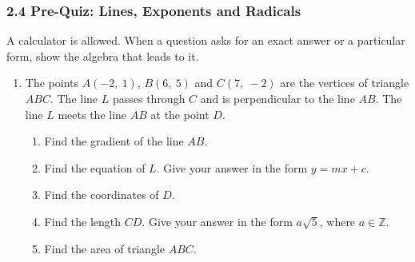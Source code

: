 \documentclass[12pt, twoside]{article}
\begin{document}
\subsubsection*{2.4 Pre-Quiz: Lines, Exponents and Radicals}

A calculator is allowed. When a question asks for an exact answer or a
particular form, show the algebra that leads to it.

\begin{enumerate}[itemsep=0.15cm]

\item[1.]
The points $A(-2,\ 1)$, $B(6,\ 5)$ and $C(7,\ -2)$ are the vertices of
triangle $ABC$. The line $L$ passes through $C$ and is perpendicular to
the line $AB$. The line $L$ meets the line $AB$ at the point $D$.

\begin{minipage}[t]{0.6\linewidth}
\vspace{0pt}
\begin{enumerate}[itemsep=0.1cm]
  \item Find the gradient of the line $AB$.
  \item Find the equation of $L$. Give your answer in the form
  $y = mx + c$.
  \item Find the coordinates of $D$.
  \item Find the length $CD$. Give your answer in the form $a\sqrt{5}$, where $a \in \mathbb{Z}$.
  \item Find the area of triangle $ABC$.
\end{enumerate}
\end{minipage}
\hfill
\begin{minipage}[t]{0.37\linewidth}
\vspace{0pt}
\centering
{}
\end{minipage}


\end{enumerate}
\end{document}
